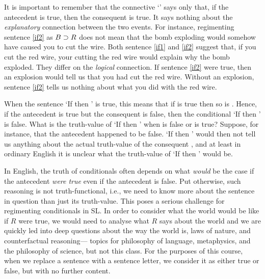 It is important to remember that the connective `\eif' says only that, if the antecedent is true, then the consequent is true.
It says nothing about the \emph{explanatory} connection between the two events.
For instance, regimenting sentence \ref{if2} as $B \supset R$ does not mean that the bomb exploding would somehow have caused you to cut the wire.
Both sentence \ref{if1} and \ref{if2} suggest that, if you cut the red wire, your cutting the red wire would explain why the bomb exploded.
They differ on the \emph{logical} connection.
If sentence \ref{if2} were true, then an explosion would tell us that you had cut the red wire.
Without an explosion, sentence \ref{if2} tells us nothing about what you did with the red wire.



When the sentence `If \metaA{} then \metaB{}' is true, this means that if \metaA{} is true then so is \metaB{}.
Hence, if the antecedent \metaA{} is true but the consequent \metaB{} is false, then the conditional `If \metaA{} then \metaB{}' is false.
What is the truth-value of `If \metaA{} then \metaB{}' when \metaA{} is false or \metaB{} is true?
Suppose, for instance, that the antecedent \metaA{} happened to be false.
`If \metaA{} then \metaB{}' would then not tell us anything about the actual truth-value of the consequent \metaB{}, and at least in ordinary English it is unclear what the truth-value of `If \metaA{} then \metaB{}' would be. 

In English, the truth of conditionals often depends on what \emph{would} be the case if the antecedent \emph{were true} even if the antecedent is false.
Put otherwise, such reasoning is not truth-functional, i.e., we need to know more about the sentence in question than just its truth-value.
This poses a serious challenge for regimenting conditionals in SL.
In order to consider what the world would be like if $R$ were true, we would need to analyse what $R$ says about the world and we are quickly led into deep questions about the way the world is, laws of nature, and counterfactual reasoning--- topics for philosophy of language, metaphysics, and the philosophy of science, but not this class.
For the purposes of this course, when we replace a sentence with a sentence letter, we consider it as either true or false, but with no further content.

